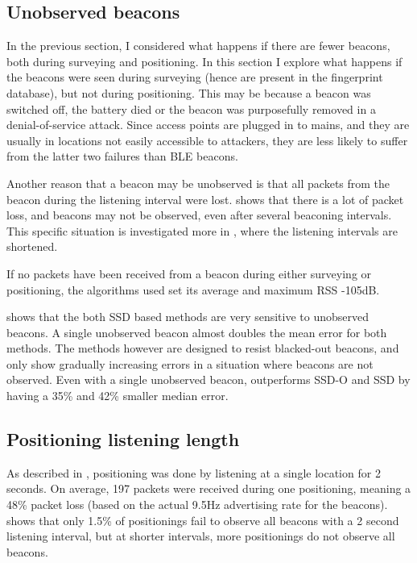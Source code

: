 \subsection{Unobserved beacons}
\label{sec:architecture-dying-beacons}
In the previous section, I considered what happens if there are fewer beacons, both during surveying and positioning.
In this section I explore what happens if the beacons were seen during surveying (hence are present in the fingerprint database), but not during positioning.
This may be because a beacon was switched off, the battery died or the beacon was purposefully removed in a denial-of-service attack.
Since \wifi access points are plugged in to mains, and they are usually in locations not easily accessible to attackers, they are less likely to suffer from the latter two failures than BLE beacons.

Another reason that a beacon may be unobserved is that all packets from the beacon during the listening interval were lost.
 shows that there is a lot of packet loss, and beacons may not be observed, even after several beaconing intervals.
This specific situation is investigated more in , where the listening intervals are shortened.

If no packets have been received from a beacon during either surveying or positioning, the algorithms used set its average and maximum RSS -105dB.

 shows that the both SSD based methods are very sensitive to unobserved beacons.
A single unobserved beacon almost doubles the mean error for both methods.
The \aBRP methods however are designed to resist blacked-out beacons, and only show gradually increasing errors in a situation where beacons are not observed.
Even with a single unobserved beacon, \aBRP outperforms SSD-O and SSD by having a 35\% and 42\% smaller median error.

\subsection{Positioning listening length}
\label{sec:architecture-short-walk}
As described in , positioning was done by listening at a single location for 2 seconds.
On average, 197 packets were received during one positioning, meaning a 48\% packet loss (based on the actual 9.5Hz advertising rate for the beacons).
 shows that only 1.5\% of positionings fail to observe all beacons with a 2 second listening interval, but at shorter intervals, more positionings do not observe all beacons.

